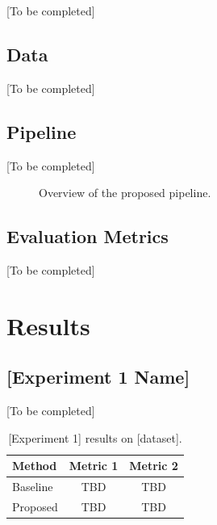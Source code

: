 \documentclass[12pt, a4paper]{report}
\begin{document}
[To be completed]

\section{Data}
\label{sec:data}

[To be completed]

\section{Pipeline}
\label{sec:pipeline}

[To be completed]

\begin{figure}[ht]
    \centering
    \caption{Overview of the proposed pipeline.}
    \label{fig:pipeline}
\end{figure}

\section{Evaluation Metrics}
\label{sec:metrics}

[To be completed]

\chapter{Results}
\label{ch:results}


\section{[Experiment 1 Name]}
\label{sec:results-exp1}

[To be completed]

\begin{table}[ht]
    \centering
    \caption{[Experiment 1] results on [dataset].}
    \label{tab:results-exp1}
    \begin{tabular}{lcc}
        \toprule
        Method & Metric 1 & Metric 2 \\
        \midrule
        Baseline & TBD & TBD \\
        Proposed & TBD & TBD \\
        \bottomrule
    \end{tabular}
\end{table}
\end{document}
